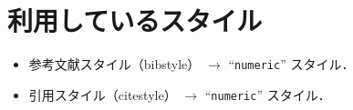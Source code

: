 \documentclass[10pt]{jlreq}
\begin{document}
\section{利用しているスタイル}

\begin{itemize}
 \item 参考文献スタイル（bibstyle） $\rightarrow$ ``\texttt{numeric}'' スタイル．
 \item 引用スタイル（citestyle） $\rightarrow$ ``\texttt{numeric}'' スタイル．
\end{itemize}


\end{document}
